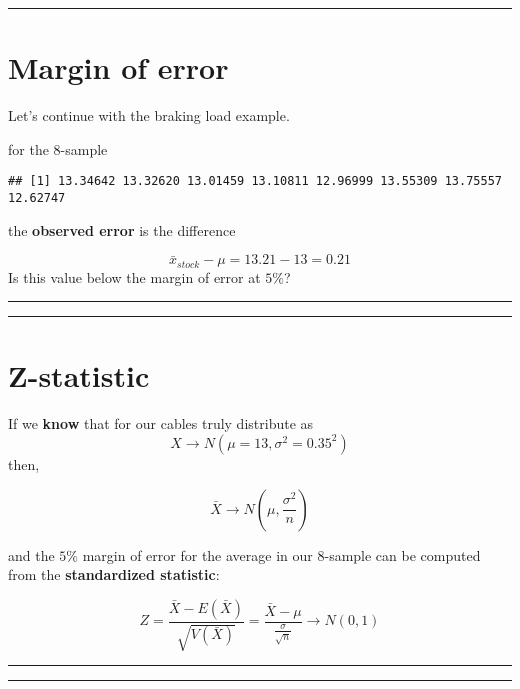 \documentclass[
]{book}
\begin{document}
\begin{center}\rule{0.5\linewidth}{0.5pt}\end{center}

\hypertarget{margin-of-error-1}{%
\section{Margin of error}\label{margin-of-error-1}}

Let's continue with the braking load example.

for the \(8\)-sample

\begin{verbatim}
## [1] 13.34642 13.32620 13.01459 13.10811 12.96999 13.55309 13.75557 12.62747
\end{verbatim}

the \textbf{observed error} is the difference

\[\bar{x}_{stock}-\mu=13.21-13=0.21\]
Is this value below the margin of error at \(5\%\)?

\begin{center}\rule{0.5\linewidth}{0.5pt}\end{center}

\begin{center}\rule{0.5\linewidth}{0.5pt}\end{center}

\hypertarget{z-statistic}{%
\section{Z-statistic}\label{z-statistic}}

If we \textbf{know} that for our cables truly distribute as
\[X \rightarrow N(\mu=13, \sigma^2=0.35^2)\] then,

\[\bar{X} \rightarrow N(\mu, \frac{\sigma^2}{n})\]

and the \(5\%\) margin of error for the average in our \(8\)-sample can be computed from the \textbf{standardized statistic}:

\[Z=\frac{\bar{X}-E(\bar{X})}{\sqrt{V(\bar{X})}} =\frac{\bar{X}-\mu}{\frac{\sigma}{\sqrt{n}}}  \rightarrow N(0,1)\]

\begin{center}\rule{0.5\linewidth}{0.5pt}\end{center}

\begin{center}\rule{0.5\linewidth}{0.5pt}\end{center}
\end{document}
